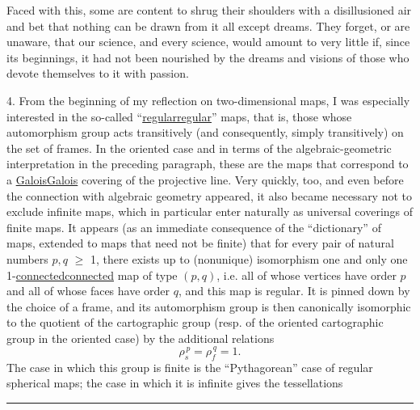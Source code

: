 \documentclass[11pt,a4paper]{article}
\newif\ifenglish
\def\CurrentApparatus{}
\let\TextUline\uline
\renewcommand{\uline}[1]{\ifmmode\underline{#1}\else\TextUline{#1}\fi}
\newcommand{\margin}[1]{%
  \sbox{\MarginalTestBox}{\parbox{\marginparwidth}{\raggedright\footnotesize#1}}%
  \ifdim\dimexpr\ht\MarginalTestBox+\dp\MarginalTestBox\relax>3\baselineskip
    \par\smallskip\noindent\begin{minipage}{\linewidth}\hrule\smallskip
    {\footnotesize\textcolor{HandInk}{\ifenglish Marginal note:\else Note marginale :\fi\ #1}}\smallskip\hrule\end{minipage}\par\smallskip
  \else
    \marginnote{\raggedright\footnotesize\textcolor{HandInk}{#1}}%
  \fi}
\newcommand{\finishscan}{\ifx\CurrentApparatus\empty\else\par\bigskip\noindent\rule{.35\linewidth}{.35pt}\par\smallskip{\footnotesize\setlength{\parskip}{3pt}\CurrentApparatus}\fi}
\begin{document}
Faced with this, some are content to shrug their shoulders
with a disillusioned air and bet that nothing can be drawn
from it all except dreams. They forget, or are unaware,
that our science, and every science, would amount to very little
if, since its beginnings, it had not been nourished by the dreams and visions
of those who devote themselves to it with passion.

4.        From the beginning of my reflection on two-dimensional maps,
I was especially interested in the so-called
``\uline{regular}'' maps, that is, those whose automorphism group
acts transitively (and consequently, simply transitively)
on the set of frames. In the oriented case and in terms of
the algebraic-geometric interpretation in the preceding paragraph,
these are the maps that correspond to a \uline{Galois} covering of
the projective line. Very quickly, too, and even before the connection
with algebraic geometry appeared, it also became
necessary not to exclude infinite maps, which in particular enter
naturally as universal coverings of
finite maps. It appears (as an immediate consequence of the ``dictionary''
of maps, extended to maps that need not be finite)
that for every pair of natural numbers $p, q$ $\geq$ 1, there exists up to
(nonunique) isomorphism one and only one 1-\uline{connected} map
of type $(p,q)$, i.e. all of whose vertices have order $p$
and all of whose faces have order $q$, and this map is regular.
It is pinned down by the choice of a frame, and its
automorphism group is then canonically isomorphic to the quotient
of the cartographic group (resp. of the oriented cartographic
group in the oriented case) by the additional relations
\[ \rho_s^{\,p} = \rho_f^{\,q} = 1. \]
The case in which this group is finite is the ``Pythagorean'' case of
regular spherical maps; the case in which it is infinite gives the tessellations

\margin{20}

\finishscan
\end{document}
